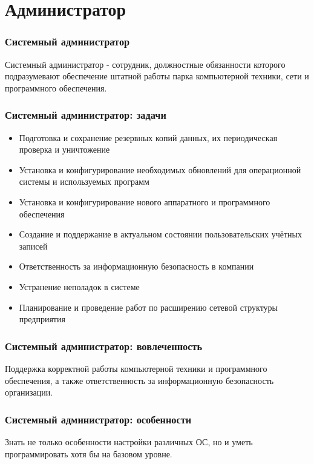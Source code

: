 \documentclass{../industrial-development}
\begin{document}
	
	\section{Администратор} 
	
	\begin{frame} \frametitle{Системный администратор}
		\begin{block}{}
			\alert {Системный администратор} - сотрудник, должностные обязанности которого подразумевают обеспечение штатной работы парка компьютерной техники, сети и программного обеспечения.
		\end{block}
	\end{frame}
	
	\begin{frame} \frametitle{Системный администратор: задачи}
		\begin{itemize}
			\item Подготовка и сохранение резервных копий данных, их периодическая проверка и уничтожение
			\item Установка и конфигурирование необходимых обновлений для операционной системы и используемых программ
			\item Установка и конфигурирование нового аппаратного и программного обеспечения
			\item Создание и поддержание в актуальном состоянии пользовательских учётных записей
			\item Ответственность за информационную безопасность в компании
			\item Устранение неполадок в системе
			\item Планирование и проведение работ по расширению сетевой структуры предприятия
		\end{itemize}
	\end{frame}
	\begin{frame} \frametitle{Системный администратор: вовлеченность}
		Поддержка корректной работы компьютерной техники и программного обеспечения, а также ответственность за информационную безопасность организации.
	\end{frame}
	
	\begin{frame} \frametitle{Системный администратор: особенности}
		Знать не только особенности настройки различных ОС, но и уметь программировать хотя бы на базовом уровне.
	\end{frame}
	
\end{document}
